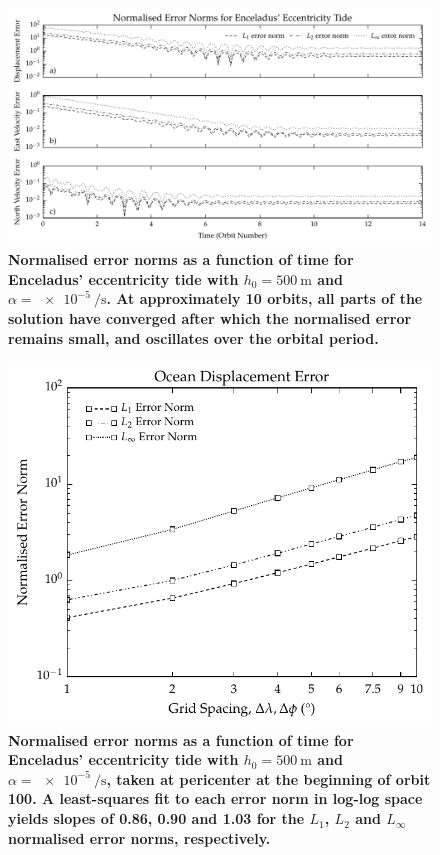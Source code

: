 \begin{figure}[t]
\centering
\includegraphics[width=\linewidth]{Figures/temporal_error_ecc}
\caption{\textbf{Normalised error norms as a function of time for Enceladus' eccentricity tide with $h_0 = \SI{500}{\metre}$ and $\alpha = \SI{e-5}{\per\second}$. At approximately \num{10} orbits, all parts of the solution have converged after which the normalised error remains small, and oscillates over the orbital period.} \label{fig:temporal_error}}
\end{figure}


\begin{figure}[t]
\centering
\includegraphics[width=0.6\linewidth]{Figures/convergence_eta}
\caption{\textbf{Normalised error norms as a function of time for Enceladus' eccentricity tide with $h_0 = \SI{500}{\metre}$ and $\alpha = \SI{e-5}{\per\second}$, taken at pericenter at the beginning of orbit \num{100}. A least-squares fit to each error norm in log-log space yields slopes of \num{0.86}, \num{0.90} and \num{1.03} for the $L_1$, $L_2$ and $L_{\infty}$ normalised error norms, respectively.} \label{fig:spatial_convergence}}
\end{figure}



